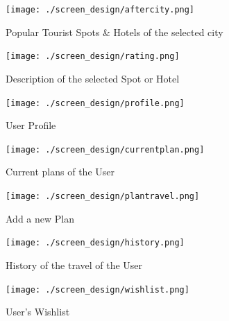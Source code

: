 \documentclass[11pt]{article}
\begin{document}
\begin{figure}[ht!]
\hfill\texttt{[image: ./screen\_design/aftercity.png]}\hspace*{\fill}
\caption{Popular Tourist Spots \& Hotels of the selected city}
\end{figure}

\begin{figure}[ht!]
\hfill\texttt{[image: ./screen\_design/rating.png]}\hspace*{\fill}
\caption{Description of the selected Spot or Hotel}
\end{figure}

\begin{figure}[ht!]
\hfill\texttt{[image: ./screen\_design/profile.png]}\hspace*{\fill}
\caption{User Profile}
\end{figure}

\begin{figure}[ht!]
\hfill\texttt{[image: ./screen\_design/currentplan.png]}\hspace*{\fill}
\caption{Current plans of the User}
\end{figure}

\begin{figure}[ht!]
\hfill\texttt{[image: ./screen\_design/plantravel.png]}\hspace*{\fill}
\caption{Add a new Plan}
\end{figure}

\begin{figure}[ht!]
\hfill\texttt{[image: ./screen\_design/history.png]}\hspace*{\fill}
\caption{History of the travel of the User}
\end{figure}

\begin{figure}[ht!]
\hfill\texttt{[image: ./screen\_design/wishlist.png]}\hspace*{\fill}
\caption{User's Wishlist}
\end{figure}
\end{document}
